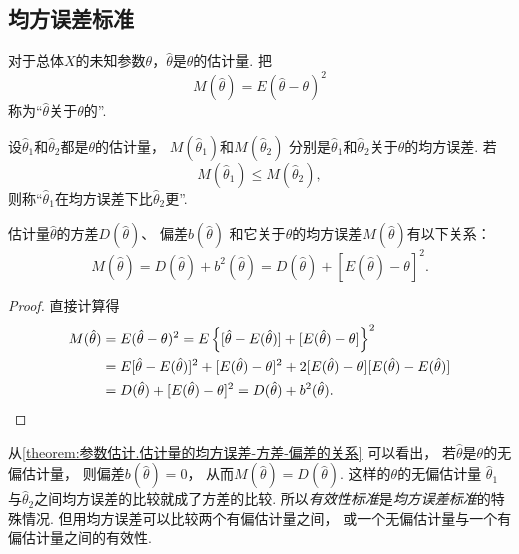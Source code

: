 \subsection{均方误差标准}
\begin{definition}
对于总体\(X\)的未知参数\(\theta\)，\(\hat{\theta}\)是\(\theta\)的估计量.
把\begin{equation*}
	M(\hat{\theta}) = E(\hat{\theta} - \theta)^2
\end{equation*}称为“\(\hat{\theta}\)关于\(\theta\)的”.
\end{definition}

\begin{definition}
设\(\hat{\theta}_1\)和\(\hat{\theta}_2\)都是\(\theta\)的估计量，
\(M(\hat{\theta}_1)\)和\(M(\hat{\theta}_2)\)
分别是\(\hat{\theta}_1\)和\(\hat{\theta}_2\)关于\(\theta\)的均方误差.
若\begin{equation*}
	M(\hat{\theta}_1) \leq M(\hat{\theta}_2),
\end{equation*}
则称“\(\hat{\theta}_1\)在均方误差下比\(\hat{\theta}_2\)更”.
\end{definition}

\begin{theorem}\label{theorem:参数估计.估计量的均方误差-方差-偏差的关系}
估计量\(\hat{\theta}\)的方差\(D(\hat{\theta})\)、
偏差\(b(\hat{\theta})\)
和它关于\(\theta\)的均方误差\(M(\hat{\theta})\)有以下关系：
\begin{equation}
	M(\hat{\theta}) = D(\hat{\theta}) + b^2(\hat{\theta})
	= D(\hat{\theta}) + [E(\hat{\theta}) - \theta]^2.
\end{equation}
\begin{proof}
直接计算得\begin{align*}
	M(\hat{\theta})
	&= E(\hat{\theta} - \theta)^2
	= E\left\{
		[\hat{\theta} - E(\hat{\theta})]
		+ [E(\hat{\theta}) - \theta]
	\right\}^2 \\
	&= E[\hat{\theta} - E(\hat{\theta})]^2
	+ [E(\hat{\theta}) - \theta]^2
	+ 2[E(\hat{\theta}) - \theta][E(\hat{\theta}) - E(\hat{\theta})] \\
	&= D(\hat{\theta}) + [E(\hat{\theta}) - \theta]^2
	= D(\hat{\theta}) + b^2(\hat{\theta}).
	\qedhere
\end{align*}
\end{proof}
\end{theorem}
从\cref{theorem:参数估计.估计量的均方误差-方差-偏差的关系} 可以看出，
若\(\hat{\theta}\)是\(\theta\)的无偏估计量，
则偏差\(b(\hat{\theta})=0\)，
从而\(M(\hat{\theta})=D(\hat{\theta})\).
这样的\(\theta\)的无偏估计量
\(\hat{\theta}_1\)与\(\hat{\theta}_2\)之间均方误差的比较就成了方差的比较.
所以\emph{有效性标准}是\emph{均方误差标准}的特殊情况.
但用均方误差可以比较两个有偏估计量之间，
或一个无偏估计量与一个有偏估计量之间的有效性.

